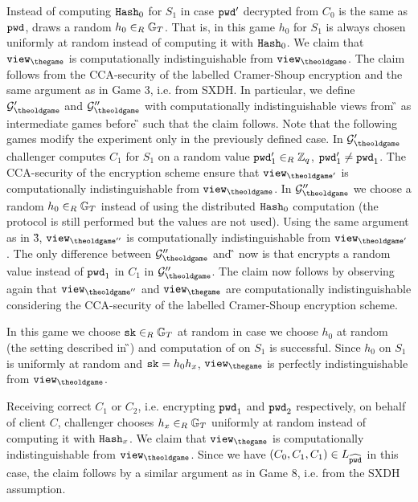 \Gh Instead of computing $\mathtt{Hash}_0$ for $S_1$ in case $\mathtt{pwd}'$ decrypted from $C_0$ is the same as $\mathtt{pwd}$, \cC draws a random $h_0\in_R\mathbb{G}_T$.
That is, in this game $h_0$ for $S_1$ is always chosen uniformly at random instead of computing it with $\mathtt{Hash}_0$.
We claim that $\view_{\thegame}$ is computationally indistinguishable from $\view_{\theoldgame}$.
The claim follows from the CCA-security of the labelled Cramer-Shoup encryption and the same argument as in Game 3, i.e. from SXDH.
In particular, we define $\G{\theoldgame}'$ and $\G{\theoldgame}''$ with computationally indistinguishable views from \G{\theoldgame} as intermediate games before \G{\thegame} such that the claim follows.
Note that the following games modify the experiment only in the previously defined case.
In $\G{\theoldgame}'$ challenger \cC computes $C_1$ for $S_1$ on a random value $\mathtt{pwd}'_1\in_R\mathbb{Z}_q$, $\mathtt{pwd}'_1\not=\mathtt{pwd}_1$.
The CCA-security of the encryption scheme ensure that $\view_{\theoldgame'}$ is computationally indistinguishable from $\view_{\theoldgame}$.
In $\G{\theoldgame}''$ we choose a random $h_0\in_R\mathbb{G}_T$ instead of using the distributed $\mathtt{Hash}_0$ computation (the protocol is still performed but the values are not used).
Using the same argument as in \G{3}, $\view_{\theoldgame''}$ is computationally indistinguishable from $\view_{\theoldgame'}$.
The only difference between $\G{\theoldgame}''$ and \G{\thegame} now is that \cC encrypts a random value instead of $\mathtt{pwd}_1$ in $C_1$ in $\G{\theoldgame}''$.
The claim now follows by observing again that $\view_{\theoldgame''}$ and $\view_{\thegame}$ are computationally indistinguishable considering the CCA-security of the labelled Cramer-Shoup encryption scheme.

\Gh In this game we choose $\mathtt{sk}\in_R\mathbb{G}_T$ at random in case we choose $h_0$ at random (the setting described in \G{\theoldgame}) and computation of \sk on $S_1$ is successful.
Since $h_0$ on $S_1$ is uniformly at random and $\mathtt{sk}=h_0h_x$, $\view_{\thegame}$ is perfectly indistinguishable from $\view_{\theoldgame}$.

\Gh Receiving correct $C_1$ or $C_2$, i.e. encrypting $\mathtt{pwd}_1$ and $\mathtt{pwd}_2$ respectively, on behalf of client $C$, challenger \cC chooses $h_x\in_R\mathbb{G}_T$ uniformly at random instead of computing it with $\mathtt{Hash}_x$.
We claim that $\view_{\thegame}$ is computationally indistinguishable from $\view_{\theoldgame}$.
Since we have $(C_0,C_1,C_1)\in L_{\widehat{\mathtt{pwd}}}$ in this case, the claim follows by a similar argument as in Game 8, i.e. from the SXDH assumption.

